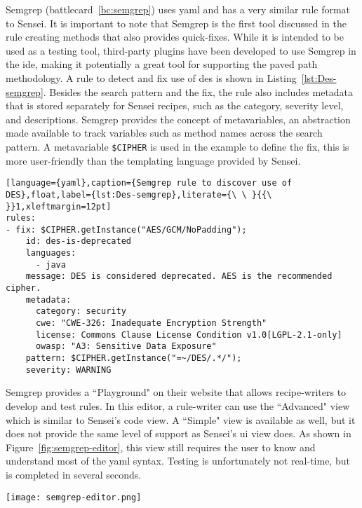 Semgrep (battlecard~\ref{bc:semgrep}) uses \gls{yaml} and has a very similar rule format to Sensei.
It is important to note that Semgrep is the first tool discussed in the rule creating methods that also provides quick-fixes.
While it is intended to be used as a testing tool, third-party plugins have been developed to use Semgrep in the \gls{ide}, making it potentially a great tool for supporting the paved path methodology.
A rule to detect and fix use of \gls{des} is shown in Listing~\ref{lst:Des-semgrep}.
Besides the search pattern and the fix, the rule also includes metadata that is stored separately for Sensei recipes, such as the category, severity level, and descriptions.
Semgrep provides the concept of metavariables, an abstraction made available to track variables such as method names across the search pattern.
A metavariable \texttt{\$CIPHER} is used in the example to define the fix, this is more user-friendly than the templating language provided by Sensei.

\begin{lstlisting}[language={yaml},caption={Semgrep rule to discover use of DES},float,label={lst:Des-semgrep},literate={\ \ }{{\ }}1,xleftmargin=12pt]
rules:
- fix: $CIPHER.getInstance("AES/GCM/NoPadding");
    id: des-is-deprecated
    languages:
      - java
    message: DES is considered deprecated. AES is the recommended cipher.
    metadata:
      category: security
      cwe: "CWE-326: Inadequate Encryption Strength"
      license: Commons Clause License Condition v1.0[LGPL-2.1-only]
      owasp: "A3: Sensitive Data Exposure"
    pattern: $CIPHER.getInstance("=~/DES/.*/");
    severity: WARNING
\end{lstlisting}

Semgrep provides a ``Playground" on their website that allows recipe-writers to develop and test rules.
In this editor, a rule-writer can use the ``Advanced" view which is similar to Sensei's code view.
A ``Simple" view is available as well, but it does not provide the same level of support as Sensei's \gls{ui} view does.
As shown in Figure~\ref{fig:semgrep-editor}, this view still requires the user to know and understand most of the \gls{yaml} syntax.
Testing is unfortunately not real-time, but is completed in several seconds.

\begin{sidewaysfigure}
  \centering
  \texttt{[image: semgrep-editor.png]}
  \caption[Semgrep playground editor]{Semgrep's ``Simple" view in the Playground rule editor still requires use of the \gls{yaml} syntax.}
  \label{fig:semgrep-editor} 
\end{sidewaysfigure}

